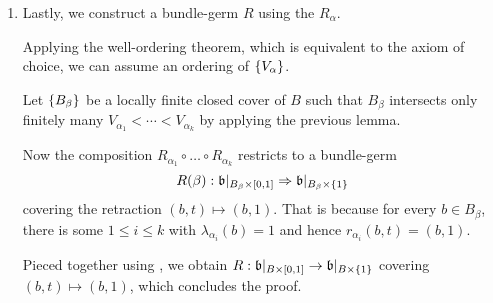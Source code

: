 \begin{scope}
\begin{myproof}
\begin{enumerate}
            \item
            Lastly, we construct a bundle-germ $R$ using the $R_\alpha$.

            Applying the well-ordering theorem,
            which is equivalent to the axiom of choice, we can assume an ordering of $\{V_\alpha\}$.

            Let $\{B_\beta\}$ be a locally finite closed cover of $B$
            such that $B_\beta$ intersects only finitely many $V_{\alpha_1} < \cdots < V_{\alpha_k}$
            by applying the previous lemma.

            Now the composition $R_{\alpha_1} \circ \ldots \circ R_{\alpha_k}$ restricts to a bundle-germ 
            \[ R(\beta): \mathfrak{b}\vert_{B_\beta \times{} [0, 1]} \Rightarrow{} \mathfrak{b}\vert_{B_\beta \times{} \{1\}} \]
            covering the retraction $(b, t) \mapsto (b, 1)$.
            That is because for every $b \in B_\beta$,
            there is some $1 \le i \le k$ with
            $\lambda_{\alpha_i}(b) = 1$ and hence $r_{\alpha_i}(b, t) = (b, 1)$.
            
            Pieced together using ,
            we obtain $R: \mathfrak{b}\vert_{B \times{} [0, 1]} \to \mathfrak{b}\vert_{B \times{} \{1\}}$
            covering $(b, t) \mapsto (b, 1)$, which concludes the proof.
        \end{enumerate}    
    \end{myproof}
\end{scope}